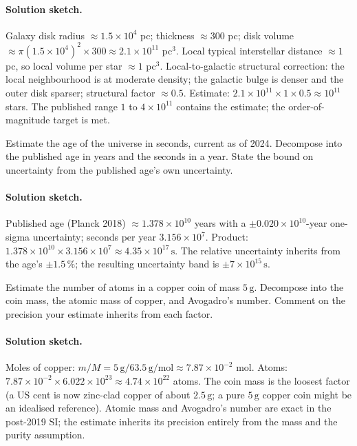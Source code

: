 \paragraph{Solution sketch.}
Galaxy disk radius $\approx 1.5 \times 10^{4}$ pc; thickness
$\approx 300$ pc; disk volume $\approx \pi (1.5 \times 10^{4})^{2}
\times 300 \approx 2.1 \times 10^{11}$ pc$^{3}$. Local typical
interstellar distance $\approx 1$ pc, so local volume per star
$\approx 1$ pc$^{3}$. Local-to-galactic structural correction:
the local neighbourhood is at moderate density; the galactic bulge
is denser and the outer disk sparser; structural factor $\approx
0.5$. Estimate: $2.1 \times 10^{11} \times 1 \times 0.5 \approx
10^{11}$ stars. The published range $1$ to $4 \times 10^{11}$
contains the estimate; the order-of-magnitude target is met.

\begin{exercise}
Estimate the age of the universe in seconds, current as of 2024.
Decompose into the published age in years and the seconds in a
year. State the bound on uncertainty from the published age's own
uncertainty.
\end{exercise}

\paragraph{Solution sketch.}
Published age (Planck 2018) $\approx 1.378 \times 10^{10}$ years
with a $\pm 0.020 \times 10^{10}$-year one-sigma uncertainty;
seconds per year $3.156 \times 10^{7}$. Product: $1.378 \times
10^{10} \times 3.156 \times 10^{7} \approx 4.35 \times 10^{17}
\,\si{\second}$. The relative uncertainty inherits from the age's
$\pm 1.5\,\%$; the resulting uncertainty band is $\pm 7 \times
10^{15} \,\si{\second}$.

\begin{exercise}
Estimate the number of atoms in a copper coin of mass $5 \,\si{\gram}$.
Decompose into the coin mass, the atomic mass of copper, and
Avogadro's number. Comment on the precision your estimate
inherits from each factor.
\end{exercise}

\paragraph{Solution sketch.}
Moles of copper: $m / M = 5 \,\si{\gram} / 63.5 \,\si{\gram\per
\mol} \approx 7.87 \times 10^{-2}$ mol. Atoms: $7.87 \times 10^{-2}
\times 6.022 \times 10^{23} \approx 4.74 \times 10^{22}$ atoms. The
coin mass is the loosest factor (a US cent is now zinc-clad copper
of about $2.5 \,\si{\gram}$; a pure $5 \,\si{\gram}$ copper coin
might be an idealised reference). Atomic mass and Avogadro's number
are exact in the post-2019 SI; the estimate inherits its precision
entirely from the mass and the purity assumption.

